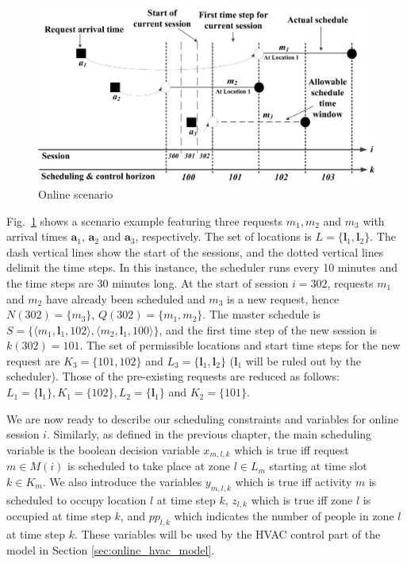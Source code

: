 \begin{figure}[t]
\centering
\includegraphics[width=5in,keepaspectratio]{figs/timeline.jpg}	
\caption{Online scenario}
\label{fig:timeline}
\end{figure}

Fig.~\ref{fig:timeline} shows a scenario example featuring three requests $m_1, m_2$ and $m_3$ with arrival times $\bm{a}_1$, $\bm{a}_2$ and $\bm{a}_3$, respectively. The set of locations is $L=\{{\bm l}_1,{\bm l}_2\}$. The dash vertical lines show the start of the sessions, and the dotted vertical lines delimit the time steps. In this instance, the scheduler runs every 10 minutes and the time steps are 30 minutes long. At the start of session $i=302$, requests $m_1$ and $m_2$ have already been scheduled and $m_3$ is a new request,
hence $N(302) = \{m_3\}$, $Q(302) = \{m_1,m_2\}$. The master schedule is $S=\{\langle m_1, {\bm l}_1, 102\rangle, \langle m_2, {\bm l}_1, 100\rangle\}$, and the first time step of the new session is $k(302) = 101$. The set of permissible locations and start time steps for the new request are $K_3=\{101,102\}$ and $L_3=\{{\bm l}_1,{\bm l}_2\}$ (${\bm l}_1$ will be ruled out by the scheduler).
Those of the pre-existing requests are reduced as follows: $L_1 =\{{\bm l}_1\}, K_1=\{102\}, L_2 = \{{\bm l}_1\}$ and $K_2 =\{101\}$. 

We are now ready to describe our scheduling constraints and variables for online session $i$. Similarly, as defined in the previous chapter, the main scheduling variable is the boolean decision variable $x_{m,l,k}$ which is true iff request $m\in M(i)$ is scheduled to take place at zone $l\in L_m$ starting at time slot $k\in K_m$. We also introduce the variables $y_{m,l,k}$ which is true iff activity $m$ is scheduled to occupy location $l$ at time step $k$, $z_{l,k}$ which is true iff zone $l$ is occupied at time step $k$, and $pp_{l,k}$ which indicates the number of people in zone $l$ at time step $k$. These variables will be used by the HVAC control part of the model in Section \ref{sec:online_hvac_model}.

